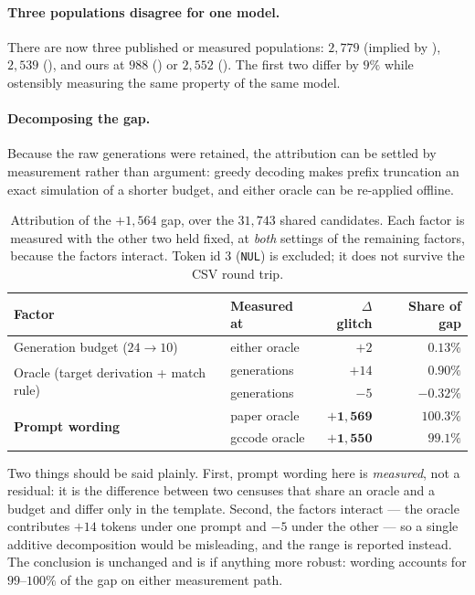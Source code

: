 \paragraph{Three populations disagree for one model.} There are now three
published or measured populations: $2{,}779$ (implied by \gp{}), $2{,}539$
(\gc{}), and ours at $988$ (\Ppaper{}) or $2{,}552$ (\Pcode{}). The first two
differ by $9\%$ while ostensibly measuring the same property of the same model.

\paragraph{Decomposing the gap.} Because the raw generations were retained, the
attribution can be settled by measurement rather than argument: greedy decoding
makes prefix truncation an exact simulation of a shorter budget, and either
oracle can be re-applied offline.

\begin{table}[h]
\centering
\caption{Attribution of the $+1{,}564$ gap, over the $31{,}743$ shared candidates.
Each factor is measured with the other two held fixed, at \emph{both} settings of
the remaining factors, because the factors interact. Token id $3$ (\texttt{NUL})
is excluded; it does not survive the CSV round trip.}
\label{tab:factorial}
\begin{tabular}{llrr}
\toprule
Factor & Measured at & $\Delta$ glitch & Share of gap \\
\midrule
Generation budget ($24 \rightarrow 10$) & either oracle & $+2$ & $0.13\%$ \\
\midrule
\multirow{2}{*}{Oracle (target derivation + match rule)}
  & \Ppaper{} generations & $+14$ & $0.90\%$ \\
  & \Pcode{} generations  & $-5$  & $-0.32\%$ \\
\midrule
\multirow{2}{*}{\textbf{Prompt wording}}
  & paper oracle  & $\mathbf{+1{,}569}$ & $\mathbf{100.3\%}$ \\
  & gccode oracle & $\mathbf{+1{,}550}$ & $\mathbf{99.1\%}$ \\
\bottomrule
\end{tabular}
\end{table}

Two things should be said plainly. First, prompt wording here is \emph{measured},
not a residual: it is the difference between two censuses that share an oracle
and a budget and differ only in the template. Second, the factors interact --- the
oracle contributes $+14$ tokens under one prompt and $-5$ under the other --- so a
single additive decomposition would be misleading, and the range is reported
instead. The conclusion is unchanged and is if anything more robust: wording
accounts for $99$--$100\%$ of the gap on either measurement path.

